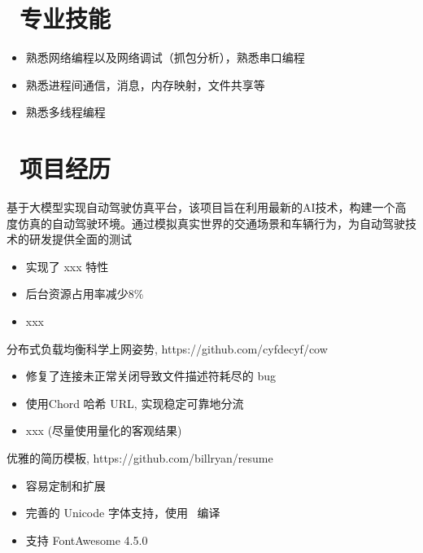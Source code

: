 \documentclass{resume}
\begin{document}



\section{\faCogs\ 专业技能}
\begin{itemize}[parsep=0.5ex]
  \item 熟悉网络编程以及网络调试（抓包分析），熟悉串口编程
  \item 熟悉进程间通信，消息，内存映射，文件共享等
  \item 熟悉多线程编程
\end{itemize}

\section{\faTasks\ 项目经历}
\begin{onehalfspacing}
  基于大模型实现自动驾驶仿真平台，该项目旨在利用最新的AI技术，构建一个高度仿真的自动驾驶环境。通过模拟真实世界的交通场景和车辆行为，为自动驾驶技术的研发提供全面的测试
  \begin{itemize}
    \item 实现了 xxx 特性
    \item 后台资源占用率减少8\%
    \item xxx
  \end{itemize}
\end{onehalfspacing}

\begin{onehalfspacing}
  分布式负载均衡科学上网姿势, https://github.com/cyfdecyf/cow
  \begin{itemize}
    \item 修复了连接未正常关闭导致文件描述符耗尽的 bug
    \item 使用Chord 哈希 URL, 实现稳定可靠地分流
    \item xxx (尽量使用量化的客观结果)
  \end{itemize}
\end{onehalfspacing}

\begin{onehalfspacing}
  优雅的简历模板, https://github.com/billryan/resume
  \begin{itemize}
    \item 容易定制和扩展
    \item 完善的 Unicode 字体支持，使用 \XeLaTeX\ 编译
    \item 支持 FontAwesome 4.5.0
  \end{itemize}
\end{onehalfspacing}
\end{document}
